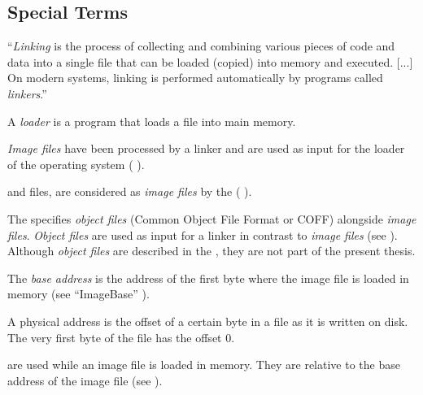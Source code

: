\subsection*{Special Terms}

\begin{definition}[linker]
\enquote{\emph{Linking} is the process of collecting and combining various pieces of code and data into a single file that can be loaded (copied) into memory and executed. [...] On modern systems, linking is performed automatically by programs called \emph{linkers}.} \cite[]{bryant11}
\end{definition} 

\begin{definition}[loader]
A \emph{loader} is a program that loads a file into main memory.
\end{definition} 

\begin{definition}
\emph{Image files} have been processed by a linker and are used as input for the loader of the operating system (\cf{} \cite[]{pespec}).
\end{definition} 

\EXE{} and \DLL{} files, are considered as \emph{image files} by the \PECOFF{} (\cf{} \cite[]{pespec}).

The \PECOFF{} specifies \emph{object files} (Common Object File Format or {COFF}) alongside \emph{image files}. \emph{Object files} are used as input for a linker in contrast to \emph{image files} (see \cite[]{pespec}). Although \emph{object files} are described in the \PECOFF{}, they are not part of the present thesis.

\begin{definition}
The \emph{base address} is the address of the first byte where the image file is loaded in memory (see \enquote{ImageBase} \cite[]{pespec}).
\end{definition} 

\begin{definition}
A physical address is the offset of a certain byte in a file as it is written on disk. The very first byte of the file has the offset 0.
\end{definition} 

\begin{definition}[RVA]
\emph{} are used while an image file is loaded in memory. They are relative to the base address of the image file (see \cite[]{pespec}).
\end{definition} 

